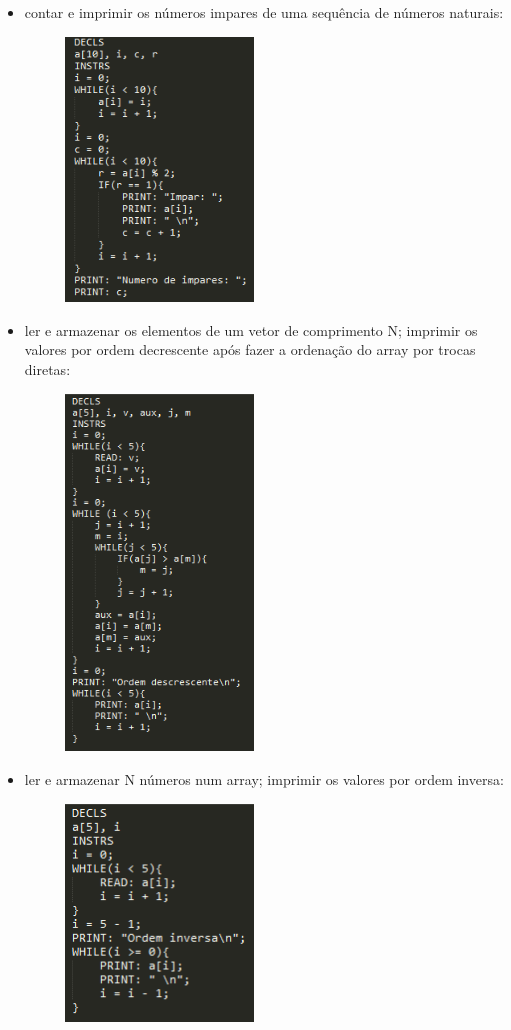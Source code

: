 \documentclass{report}
\begin{document}
\begin{itemize}
\begin{figure}[h]
	\end{figure}
	\newpage
	\item contar e imprimir os números impares de uma sequência de números naturais:
	\begin{figure}[h]
	\centering
	\includegraphics[width=50mm, scale=0.5]{ex4.PNG}
	\end{figure}
	\item ler e armazenar os elementos de um vetor de comprimento N; imprimir os valores por ordem decrescente após fazer a ordenação do array por trocas diretas:
	\begin{figure}[h]
	\centering
	\includegraphics[width=50mm, scale=0.5]{ex5.PNG}
	\end{figure}
	\newpage
	\item ler e armazenar N números num array; imprimir os valores por ordem inversa:
	\begin{figure}[h]
	\centering
	\includegraphics[width=50mm, scale=0.5]{ex6.PNG}
	\end{figure}
\end{itemize}
\end{document}
